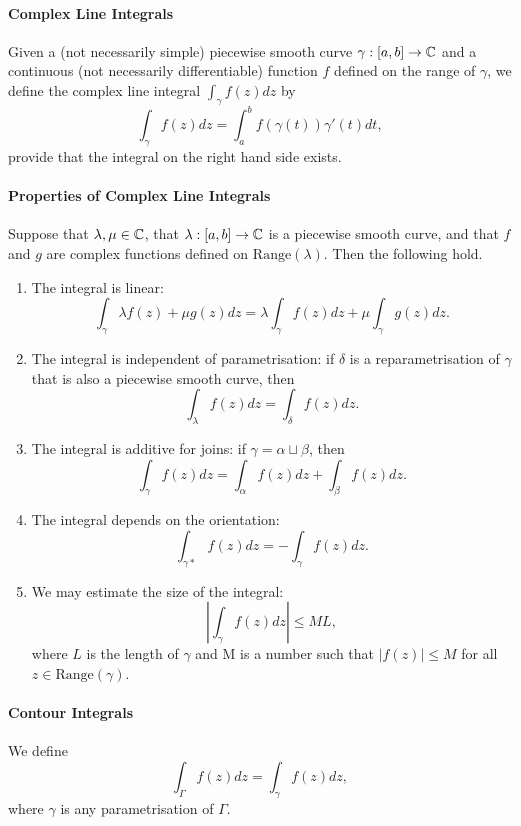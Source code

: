 \paragraph{Complex Line Integrals}
Given a (not necessarily simple) piecewise smooth curve \(\gamma: [a, b] \to \mathbb{C}\) and a continuous (not necessarily differentiable) function \(f\) defined on the range of \(\gamma\), we define the complex line integral \(\int_\gamma f(z) dz\) by
\[\int_\gamma f(z) dz = \int_a^b f(\gamma(t))\gamma'(t) dt,\]
provide that the integral on the right hand side exists.

\paragraph{Properties of Complex Line Integrals}
Suppose that \(\lambda, \mu \in \mathbb{C}\), that \(\lambda: [a, b] \to \mathbb{C}\) is a piecewise smooth curve, and that \(f\) and \(g\) are complex functions defined on \(\mathrm{Range}(\lambda)\). Then the following hold.
\begin{enumerate}[label=(\alph*)]
    \item The integral is linear:
    \[\int_\gamma \lambda f(z) + \mu g(z) dz = \lambda \int_\gamma f(z) dz + \mu \int_\gamma g(z) dz.\]
    \item The integral is independent of parametrisation: if \(\delta\) is a reparametrisation of \(\gamma\) that is also a piecewise smooth curve, then
    \[\int_\lambda f(z) dz = \int_\delta f(z) dz.\]
    \item The integral is additive for joins: if \(\gamma = \alpha \sqcup \beta\), then
    \[\int_\gamma f(z) dz = \int_\alpha f(z) dz + \int_\beta f(z) dz.\]
    \item The integral depends on the orientation:
    \[\int_{\gamma*} f(z) dz = -\int_\gamma f(z) dz.\]
    \item We may estimate the size of the integral:
    \[|\int_\gamma f(z) dz| \leq ML,\]
    where \(L\) is the length of \(\gamma\) and M is a number such that \(|f(z)| \leq M\) for all \(z \in \mathrm{Range}(\gamma)\).
\end{enumerate}

\paragraph{Contour Integrals}
We define
\[\int_\Gamma f(z) dz = \int_\gamma f(z) dz,\]
where \(\gamma\) is any parametrisation of \(\Gamma\).